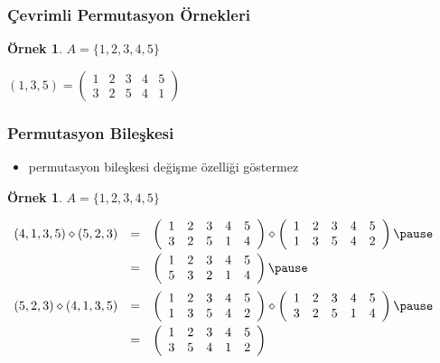 \documentclass[dvipsnames]{beamer}
\theoremstyle{definition}
\theoremstyle{example}
\newtheorem{ornek}[theorem]{Örnek}
\theoremstyle{plain}
\begin{document}
\begin{frame}
  \frametitle{Çevrimli Permutasyon Örnekleri}

  \begin{ornek}
    $A = \{1,2,3,4,5\}$

    \medskip
    $(1,3,5) = \left(
      \begin{array}{ccccc}
        1 & 2 & 3 & 4 & 5\\
        3 & 2 & 5 & 4 & 1
      \end{array}
    \right)$
  \end{ornek}
\end{frame}

\begin{frame}
  \frametitle{Permutasyon Bileşkesi}

  \begin{itemize}
    \item permutasyon bileşkesi değişme özelliği göstermez
  \end{itemize}

  \pause
  \begin{ornek}
    $A = \{1,2,3,4,5\}$

    \medskip
    \small{$\begin{array}{lll}
      (4,1,3,5) \diamond (5,2,3) & = & \left(
        \begin{array}{ccccc}
          1 & 2 & 3 & 4 & 5\\
          3 & 2 & 5 & 1 & 4
        \end{array}
      \right) \diamond \left(
        \begin{array}{ccccc}
          1 & 2 & 3 & 4 & 5\\
          1 & 3 & 5 & 4 & 2
        \end{array}
      \right)\smallskip\pause\\
      & = & \left(
        \begin{array}{ccccc}
          1 & 2 & 3 & 4 & 5\\
          5 & 3 & 2 & 1 & 4
        \end{array}
      \right)\medskip\pause\\
      (5,2,3) \diamond (4,1,3,5) & = & \left(
        \begin{array}{ccccc}
          1 & 2 & 3 & 4 & 5\\
          1 & 3 & 5 & 4 & 2
        \end{array}
      \right) \diamond \left(
        \begin{array}{ccccc}
          1 & 2 & 3 & 4 & 5\\
          3 & 2 & 5 & 1 & 4
      \end{array}
    \right)\smallskip\pause\\
    & = & \left(
      \begin{array}{ccccc}
        1 & 2 & 3 & 4 & 5\\
        3 & 5 & 4 & 1 & 2
      \end{array}
    \right)
    \end{array}$}
  \end{ornek}
\end{frame}
\end{document}
